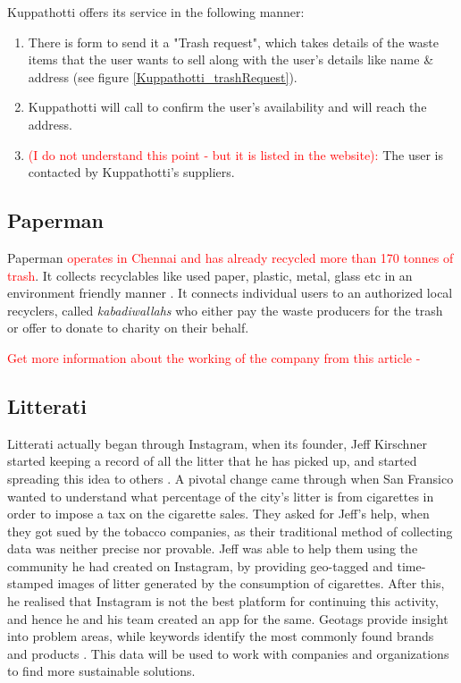 \documentclass[10pt]{article}
\begin{document}
Kuppathotti offers its service in the following manner:
\begin{enumerate}
\item There is form to send it a "Trash request", which takes details of the waste items that the user wants to sell along with the user's details like name \& address (see figure \ref{Kuppathotti_trashRequest}).
\item Kuppathotti will call to confirm the user's availability and will reach the address.
\item \textcolor{red}{(I do not understand this point - but it is listed in the website):} The user is contacted by Kuppathotti's suppliers.
\end{enumerate}

\subsection {Paperman}

Paperman \textcolor{red}{operates in Chennai and has already recycled more than 170 tonnes of trash}. It collects recyclables like used paper, plastic, metal, glass etc in an environment friendly manner \citep{Paperman:home}. It connects individual users to an authorized local recyclers, called \emph{kabadiwallahs} who either pay the waste producers for the trash or offer to donate to charity on their behalf.

\textcolor{red}{Get more information about the working of the company from this article - \cite{Paperman:yourStory}}

\subsection{Litterati}

Litterati actually began through Instagram, when its founder, Jeff Kirschner started keeping a record of all the litter that he has picked up, and started spreading this idea to others \citep{Litterati:TED_talk}. A pivotal change came through when San Fransico wanted to understand what percentage of the city's litter is from cigarettes in order to impose a tax on the cigarette sales. They asked for Jeff's help, when they got sued by the tobacco companies, as their traditional method of collecting data was neither precise nor provable. Jeff was able to help them using the community he had created on Instagram, by providing geo-tagged and time-stamped images of litter generated by the consumption of cigarettes. After this, he realised that Instagram is not the best platform for continuing this activity, and hence he and his team created an app for the same.
Geotags provide insight into problem areas, while keywords identify the most commonly found brands and products \citep{Litterati:about}. This data will be used to work with companies and organizations to find more sustainable solutions.
\end{document}

